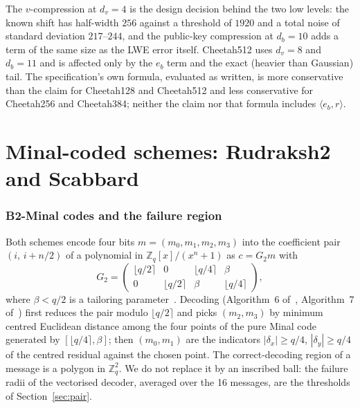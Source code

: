 \documentclass[11pt,a4paper]{article}
\theoremstyle{definition}
\theoremstyle{remark}
\newcommand{\Z}{\mathbb{Z}}
\begin{document}
The $v$-compression at $d_v=4$ is the design decision behind the two low
levels: the known shift has half-width $256$ against a threshold of
$1920$ and a total noise of standard deviation $217$--$244$, and the
public-key compression at $d_b=10$ adds a term of the same size as the LWE
error itself. Cheetah512 uses $d_v=8$ and $d_b=11$ and is affected only by
the $e_b$ term and the exact (heavier than Gaussian) tail. The
specification's own formula, evaluated as written, is more conservative
than the claim for Cheetah128 and Cheetah512 and less conservative for
Cheetah256 and Cheetah384; neither the claim nor that formula includes
$\langle e_b,r\rangle$.

\part{Minal-coded schemes: Rudraksh2 and Scabbard}

\section{B2-Minal codes and the failure region}
\label{sec:minal}

Both schemes encode four bits $m=(m_0,m_1,m_2,m_3)$ into the coefficient
pair $(i,\,i+n/2)$ of a polynomial in $\Z_q[x]/(x^n+1)$ as
$c=G_2 m$ with
\[
G_2=\begin{pmatrix}\lfloor q/2\rceil&0&\lfloor q/4\rceil&\beta\\
0&\lfloor q/2\rceil&\beta&\lfloor q/4\rceil\end{pmatrix},
\]
where $\beta<q/2$ is a tailoring parameter~\cite{Minal}. Decoding
(Algorithm~6 of~\cite{Scabbard}, Algorithm~7 of~\cite{Rudraksh2}) first
reduces the pair modulo $\lfloor q/2\rceil$ and picks $(m_2,m_3)$ by minimum
centred Euclidean distance among the four points of the pure Minal code
generated by $[\lfloor q/4\rceil,\beta]$; then $(m_0,m_1)$ are the
indicators $|\delta_x|\ge q/4$, $|\delta_y|\ge q/4$
of the centred residual against the chosen point. The correct-decoding
region of a message is a polygon in $\Z_q^2$. We do not replace it by an
inscribed ball: the failure radii of the vectorised decoder, averaged over
the 16 messages, are the thresholds of Section~\ref{sec:pair}.
\end{document}
